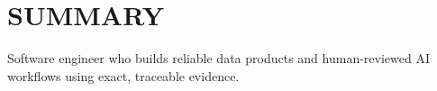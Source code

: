 \documentclass[main.tex]{subfiles}
\begin{document}
\section{SUMMARY} {
  \drawline
  Software engineer who builds reliable data products and human-reviewed AI workflows using exact, traceable evidence.
}
\end{document}
